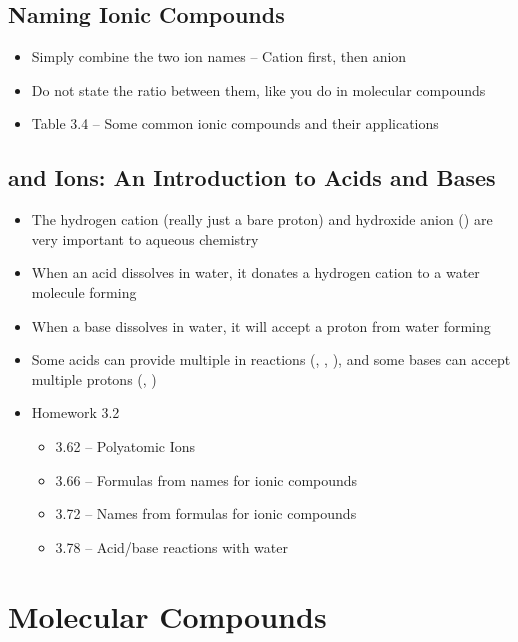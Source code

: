 \documentclass[12pt, openany, letterpaper]{memoir}
\begin{document}
\section{Naming Ionic Compounds}
\begin{itemize}
	\item Simply combine the two ion names -- Cation first, then anion
	\item Do not state the ratio between them, like you do in molecular compounds
	\item Table 3.4 -- Some common ionic compounds and their applications
\end{itemize}

\section{ and  Ions: An Introduction to Acids and Bases}
\begin{itemize}
	\item The hydrogen cation (really just a bare proton) and hydroxide anion () are very important to aqueous chemistry
	\item When an acid dissolves in water, it donates a hydrogen cation to a water molecule forming 
	\item When a base dissolves in water, it will accept a proton from water forming 
	\item Some acids can provide multiple  in reactions (, , ), and some bases can accept multiple protons (, )
	\item Homework 3.2
	      \begin{itemize}
		      \item 3.62 -- Polyatomic Ions
		      \item 3.66 -- Formulas from names for ionic compounds
		      \item 3.72 -- Names from formulas for ionic compounds
		      \item 3.78 -- Acid/base reactions with water
	      \end{itemize}
\end{itemize}

\chapter{Molecular Compounds}
\end{document}
